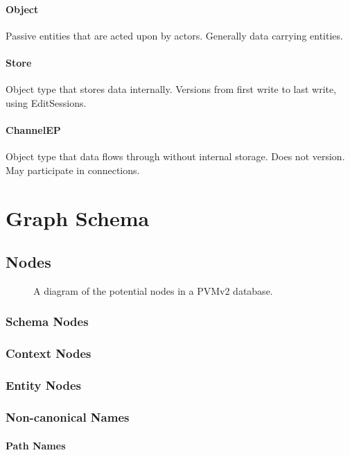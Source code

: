 \documentclass[12pt,twoside,a4paper]{article}
\begin{document}
\paragraph{Object}
Passive entities that are acted upon by actors. Generally data carrying entities.

\paragraph{Store}
Object type that stores data internally. Versions from first write to last write, using EditSessions.

\paragraph{ChannelEP}
Object type that data flows through without internal storage. Does not version. May participate in connections.

\section{Graph Schema}

\subsection{Nodes}

\begin{figure}[h]
\centering

\caption{A diagram of the potential nodes in a PVMv2 database.}
\end{figure}

\subsubsection{Schema Nodes}

\subsubsection{Context Nodes}

\subsubsection{Entity Nodes}

\subsubsection{Non-canonical Names}

\paragraph{Path Names}
\end{document}
